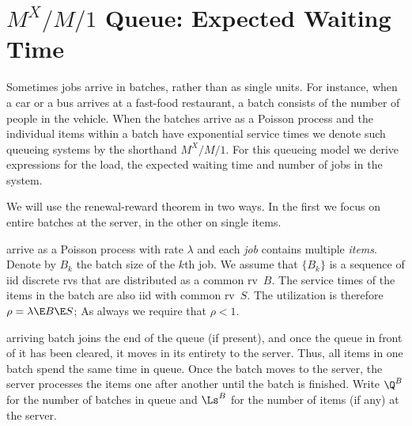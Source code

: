 


\section{$M^X/M/1$ Queue: Expected Waiting Time}
\label{sec:mxm1-queue:-expected}

Sometimes jobs arrive in batches, rather than as single units.
For instance, when a car or a bus arrives at a fast-food restaurant, a batch consists of the number of people in the vehicle.
When the batches arrive as a Poisson process and the individual items within a batch have exponential service times we denote such queueing systems by the shorthand $M^X/M/1$.
For this queueing model we derive expressions for the load,  the expected waiting time and number of jobs in the system.

We will use the renewal-reward theorem in two ways. In the first we focus on entire batches at the server, in the other on single items.


 arrive as a Poisson process with rate $\lambda$ and each \emph{job} contains multiple \emph{items}.
Denote by $B_k$ the batch size of the $k$th job.
We assume that $\{B_k\}$ is a sequence of iid discrete rvs that are distributed as a common rv~$B$. The service times of the items in the batch are also iid with common rv~$S$. The utilization is therefore
$\rho = \lambda \E B \E S$;
As always we require that $\rho<1$.


 arriving batch joins the end of the queue (if present), and once the queue in front of it has been cleared, it moves in its entirety to the server.
Thus, all items in one batch spend the same time in queue.
Once the batch moves to the server, the server processes the items one after another until the batch is finished.
Write $\Q^B$ for the number of batches in queue and $\Ls^B$ for the number of items (if any) at the server.



